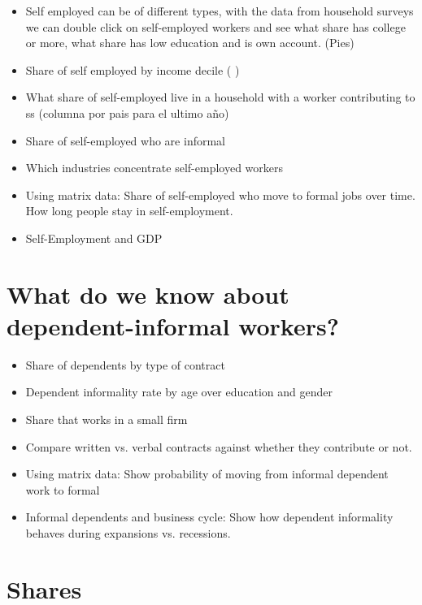 \documentclass[english]{article}
\begin{document}
    
    
    \begin{itemize}
        \item Self employed can be of different types, with the data from household surveys we can double click on self-employed workers and see what share has college or more, what share has low education and is own account. 
        (Pies)
        \item Share of self employed by income decile ( \cite{herreno_macroeconomic_2023})
        \item What share of self-employed live in a household with a worker contributing to ss (columna por pais para el ultimo año)
        \item Share of self-employed who are informal
        \item Which industries concentrate self-employed workers 
        \item Using matrix data: Share of self-employed who move to formal jobs over time. How long people stay in self-employment.
        \item Self-Employment and GDP
        
    \end{itemize}

\section {What do we know about dependent-informal workers?}    
\begin{itemize}
     \item Share of dependents by type of contract
    \item Dependent informality rate by age over education and gender
    \item Share that works in a small firm  
    \item Compare written vs. verbal contracts against whether they contribute or not.
    \item Using matrix data: Show probability of moving from informal dependent work to formal
    \item Informal dependents and business cycle: Show how dependent informality behaves during expansions vs. recessions.
\end{itemize}

\section{Shares}
\end{document}
